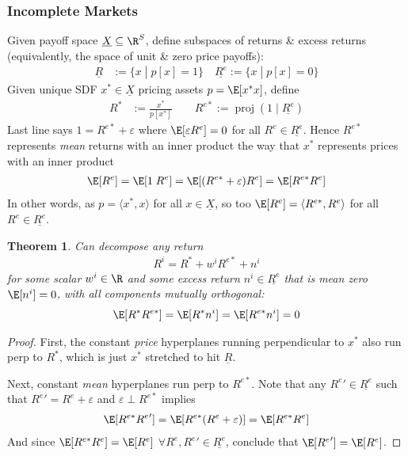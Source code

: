 \documentclass[12pt]{article}
\theoremstyle{plain}
\newtheorem{thm}{Theorem}[section]
\theoremstyle{definition}
\theoremstyle{remark}
\newcommand{\proj}{\operatorname{proj}}
\begin{document}
\begin{multicols*}{2}
\subsubsection{Incomplete Markets}

Given payoff space $\underline{X}\subseteq\R^S$, define subspaces of
returns \& excess returns (equivalently, the space of unit \& zero price
payoffs):
\begin{align*}
  \underline{R}
  &:=\{x\;|\; p[x]=1\}
  \quad
  \underline{R^e}
  :=\{x\;|\; p[x]=0\}
\end{align*}
Given unique SDF $x^*\in\underline{X}$ pricing assets $p=\E[x^*x]$,
define
\begin{align*}
  R^* &:=
  \frac{x^*}{p[x^*]}
  \qquad
  R^{e*} :=
  \proj(1\;|\;\underline{R^e})
\end{align*}
Last line says $1 = R^{e*} + \varepsilon$ where
$\E[\varepsilon R^e]=0$ for all $R^e\in\underline{R^e}$.
Hence $R^{e*}$ represents \emph{mean} returns with an inner product the
way that $x^*$ represents prices with an inner product
\begin{align*}
  \E[R^e]
  =
  \E[1 \; R^e ]
  =
  \E[(R^{e*}+\varepsilon)R^e]
  =
  \E[R^{e*}R^e]
\end{align*}
In other words, as $p=\langle x^*, x \rangle$ for all
$x\in\underline{X}$, so too
$\E[R^e]=\langle R^{e*}, R^e \rangle$ for all $R^e\in\underline{R^e}$.

\begin{thm}
Can decompose any return
\begin{align*}
  R^i = R^* + w^i R^{e*} + n^i
\end{align*}
for some scalar $w^i\in\R$ and some excess return
$n^i\in\underline{R^e}$ that is mean zero $\E[n^i]=0$, with
all components mutually orthogonal:
\begin{align*}
  \E[R^*R^{e*}]
  =
  \E[R^*n^i]
  =
  \E[R^{e*}n^i]
  = 0
\end{align*}
\end{thm}
\begin{proof}
First, the constant \emph{price} hyperplanes running perpendicular to
$x^*$ also run perp to $R^*$, which is just $x^*$ stretched to hit
$\underline{R}$.

Next, constant \emph{mean} hyperplanes run perp to $R^{e*}$.
Note that any ${R^{e}}'\in\underline{R^e}$ such that
${R^{e}}'=R^e+\varepsilon$ and $\varepsilon\perp R^{e*}$
implies
\begin{align*}
  \E[R^{e*}{R^{e}}']
  =
  \E[R^{e*}(R^{e}+\varepsilon)]
  = \E[R^{e*}R^e]
\end{align*}
And since $\E[R^{e*}R^e]=\E[R^e]$
$\forall R^e,{R^e}'\in\underline{R^e}$, conclude that
$\E[{R^{e}}']=\E[R^{e}]$.


\end{proof}
\end{multicols*}
\end{document}

